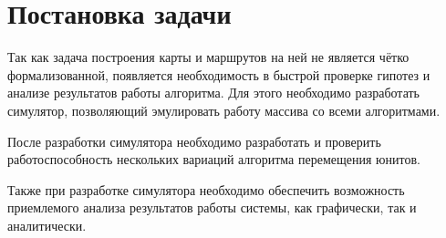 \newpage
\section{Постановка задачи}

Так как задача построения карты и маршрутов на ней
не является чётко формализованной, появляется необходимость
в быстрой проверке гипотез и анализе результатов 
работы алгоритма. Для этого необходимо разработать симулятор,
позволяющий эмулировать работу массива со всеми алгоритмами.

После разработки симулятора необходимо разработать и проверить 
работоспособность нескольких вариаций алгоритма перемещения юнитов.

Также при разработке симулятора необходимо обеспечить
возможность приемлемого анализа результатов работы
системы, как графически, так и аналитически.
